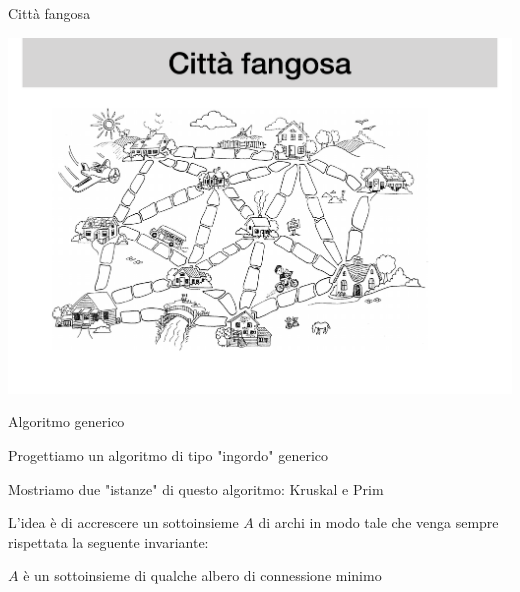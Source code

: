 \begin{OnlySlides}{Città fangosa}
\begin{center}
\includegraphics[width=\textwidth]{fangosa.pdf}
\end{center}
\end{OnlySlides}

\begin{frame}{Algoritmo generico}

\vspace{-9pt}
\begin{myboxtitle}
\BI
\item Progettiamo un algoritmo di tipo "ingordo" generico
\item Mostriamo due "istanze" di questo algoritmo: \alert{Kruskal} e \alert{Prim}
\EI
\end{myboxtitle}

\begin{myboxtitle}[Approccio]
L'idea è di accrescere un sottoinsieme $A$ di archi in modo tale che venga sempre
rispettata la seguente invariante:
\BI
\item $A$ è un sottoinsieme di qualche albero di connessione minimo
\EI
\end{myboxtitle}

\end{frame}


